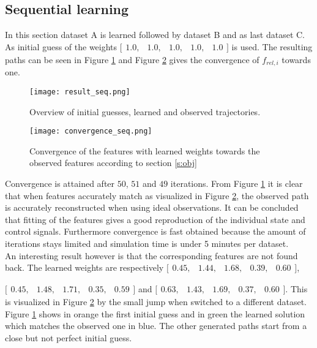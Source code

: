 \subsection{Sequential learning}
In this section dataset A is learned followed by dataset B and as last dataset C.
As initial guess of the weights $\bigl[ \begin{smallmatrix} 1.0,&1.0,&1.0,&1.0,&1.0\end{smallmatrix}\bigr]$ is used.  The resulting paths can be seen in Figure \ref{fig:result_seq} and Figure \ref{fig:convergence_seq} gives the convergence of $f_{rel,i}$ towards one.\\

\begin{figure}[h!]
	\centering
	\texttt{[image: result\_seq.png]}
	\caption{Overview of initial guesses, learned and observed trajectories.} 
	\label{fig:result_seq}
\end{figure}

\begin{figure}[h!]
	\centering
	\texttt{[image: convergence\_seq.png]}
	\caption{Convergence of the features with learned weights towards the observed features according to section \ref{s:obj}}
	\label{fig:convergence_seq}
\end{figure}

Convergence is attained after $50$, $51$ and $49$ iterations. From Figure \ref{fig:result_seq} it is clear that when features accurately match as visualized in Figure \ref{fig:convergence_seq}, the observed path is accurately reconstructed when using ideal observations. It can be concluded that fitting of the features gives a good reproduction of the individual state and control signals. Furthermore convergence is fast obtained because the amount of iterations stays limited and simulation time is under 5 minutes per dataset.\\

 An interesting result however is that the corresponding features are not found back. The learned weights are respectively $\bigl[ \begin{smallmatrix} 0.45  ,&1.44 ,&1.68 ,&0.39,&0.60\end{smallmatrix}\bigr]$, 
 
 $\bigl[ \begin{smallmatrix} 0.45  ,&1.48 ,&1.71 ,&0.35,&0.59\end{smallmatrix}\bigr]$ and $\bigl[ \begin{smallmatrix} 0.63  ,&1.43 ,&1.69 ,&0.37,&0.60\end{smallmatrix}\bigr]$. This is visualized in Figure \ref{fig:convergence_seq} by the small jump when switched to a different dataset. Figure \ref{fig:result_seq} shows in orange the first initial guess and in green the learned solution which matches the observed one in blue. The other generated paths start from a close but not perfect initial guess.\\
 
